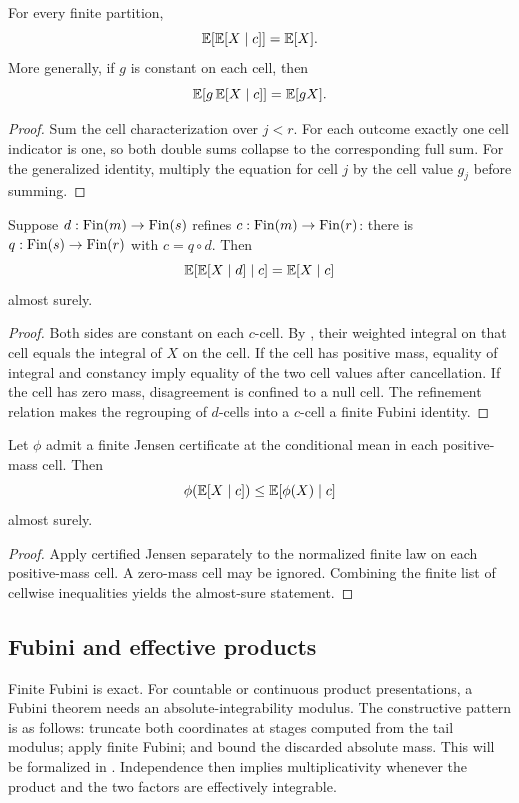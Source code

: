 \begin{theorem}\label{thm:total-expectation}
For every finite partition,
\[
 \mathbb E[\mathbb E[X\mid c]]=\mathbb E[X].
\]
More generally, if \(g\) is constant on each cell, then
\[
 \mathbb E[g\,\mathbb E[X\mid c]]=\mathbb E[gX].
\]
\end{theorem}

\begin{proof}
Sum the cell characterization over \(j<r\).  For each outcome exactly one cell
indicator is one, so both double sums collapse to the corresponding full sum.
For the generalized identity, multiply the equation for cell \(j\) by the
cell value \(g_j\) before summing.
\end{proof}

\begin{theorem}\label{thm:tower}
Suppose \(d:\operatorname{Fin}(m)\to\operatorname{Fin}(s)\) refines
\(c:\operatorname{Fin}(m)\to\operatorname{Fin}(r)\): there is \(q:\operatorname{Fin}(s)\to\operatorname{Fin}(r)\) with
\(c=q\circ d\).  Then
\[
 \mathbb E[\mathbb E[X\mid d]\mid c]=\mathbb E[X\mid c]
\]
almost surely.
\end{theorem}

\begin{proof}
Both sides are constant on each \(c\)-cell.  By
, their weighted integral
on that cell equals the integral of \(X\) on the cell.  If the cell has
positive mass, equality of integral and constancy imply equality of the two
cell values after cancellation.  If the cell has zero mass, disagreement is
confined to a null cell.  The refinement relation makes the regrouping of
\(d\)-cells into a \(c\)-cell a finite Fubini identity.
\end{proof}

\begin{theorem}\label{thm:conditional-jensen}
Let \(\phi\) admit a finite Jensen certificate at the conditional mean in each
positive-mass cell.  Then
\[
 \phi(\mathbb E[X\mid c])\le \mathbb E[\phi(X)\mid c]
\]
almost surely.
\end{theorem}

\begin{proof}
Apply certified Jensen separately to the normalized finite law on each
positive-mass cell.  A zero-mass cell may be ignored.  Combining the finite
list of cellwise inequalities yields the almost-sure statement.
\end{proof}

\subsection{Fubini and effective products}

Finite Fubini is exact.  For countable or continuous product presentations, a
Fubini theorem needs an absolute-integrability modulus.  The constructive
pattern is as follows: truncate both coordinates at stages computed from the
tail modulus; apply finite Fubini; and bound the discarded absolute mass.
This will be formalized in .  Independence then implies
multiplicativity whenever the product and the two factors are effectively
integrable.
